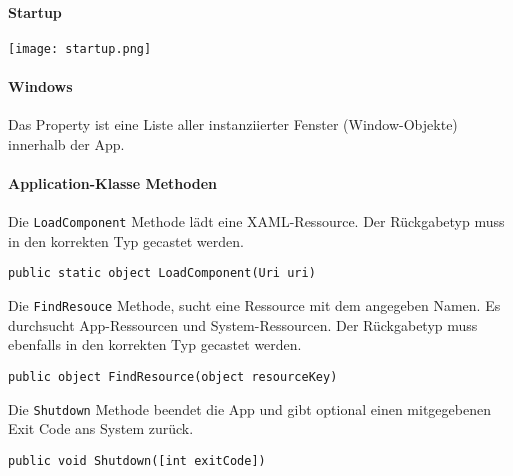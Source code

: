 \paragraph{Startup}

\texttt{[image: startup.png]}

\paragraph{Windows} Das  Property ist eine Liste aller instanziierter Fenster (Window-Objekte) innerhalb der App.
\paragraph{Application-Klasse Methoden} Die \verb+LoadComponent+ Methode lädt eine XAML-Ressource. Der Rückgabetyp muss in den korrekten Typ gecastet werden.
\begin{lstlisting}
public static object LoadComponent(Uri uri)
\end{lstlisting}
Die \verb+FindResouce+ Methode, sucht eine Ressource mit dem angegeben Namen. Es durchsucht App-Ressourcen und System-Ressourcen. Der Rückgabetyp muss ebenfalls in den korrekten Typ gecastet werden.
\begin{lstlisting}
public object FindResource(object resourceKey)
\end{lstlisting}
Die \verb+Shutdown+ Methode beendet die App und gibt optional einen mitgegebenen Exit Code ans System zurück.
\begin{lstlisting}
public void Shutdown([int exitCode])
\end{lstlisting}
